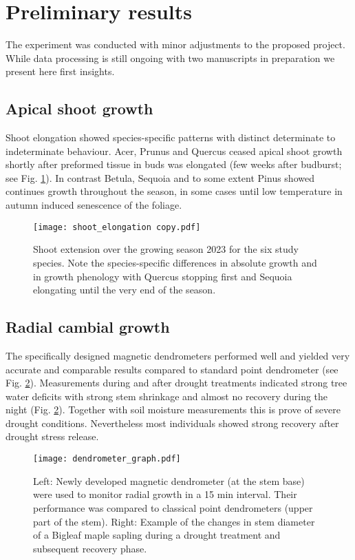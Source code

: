 \documentclass{article}
\begin{document}
	
				\newpage
				
	\section*{Preliminary results}
	The experiment was conducted with minor adjustments to the proposed project. While data processing is still ongoing with two manuscripts in preparation we present here first insights.
	
	\subsection*{Apical shoot growth}
	Shoot elongation showed species-specific patterns with distinct determinate to indeterminate behaviour. Acer, Prunus and Quercus ceased apical shoot growth shortly after preformed tissue in buds was elongated (few weeks after budburst; see Fig. \ref{fig:shoot_elongation copy}). In contrast Betula, Sequoia and to some extent Pinus showed continues growth throughout the season, in some cases until low temperature in autumn induced senescence of the foliage.
	
				\begin{figure}[H]
		\centering
		\texttt{[image: shoot\_elongation copy.pdf]} 
		\caption{Shoot extension over the growing season 2023 for the six study species. Note the species-specific differences in absolute growth and in growth phenology with Quercus stopping first and Sequoia elongating until the very end of the season.}
		\label{fig:shoot_elongation copy}
	\end{figure}
	
				\newpage
		\subsection*{Radial cambial growth}
		The specifically designed magnetic dendrometers performed well and yielded very accurate and comparable results compared to standard point dendrometer (see Fig. \ref{fig:dendrometer_graph}). Measurements during and after drought treatments indicated strong tree water deficits with strong stem shrinkage and almost no recovery during the night (Fig. \ref{fig:dendrometer_graph}). Together with soil moisture measurements this is prove of severe drought conditions. Nevertheless most individuals showed strong recovery after drought stress release. 
		
					\begin{figure}[H]
			\centering
			\texttt{[image: dendrometer\_graph.pdf]} 
			\caption{Left: Newly developed magnetic dendrometer (at the stem base) were used to monitor radial growth in a 15 min interval. Their performance was compared to classical point dendrometers (upper part of the stem). Right: Example of the changes in stem diameter of a Bigleaf maple sapling during a drought treatment and subsequent recovery phase.}
			\label{fig:dendrometer_graph}
		\end{figure}
		
\end{document}
